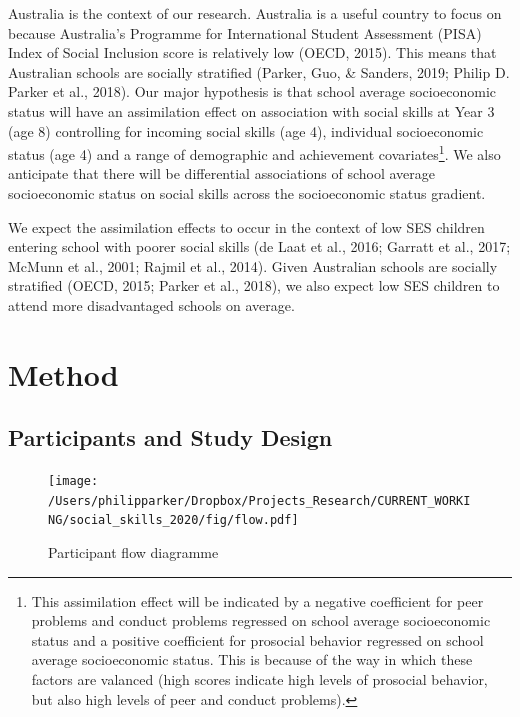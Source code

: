 \documentclass[
  english,
  man]{apa6}
\begin{document}
Australia is the context of our research. Australia is a useful country to focus on because Australia's Programme for International Student Assessment (PISA) Index of Social Inclusion score is relatively low (OECD, 2015). This means that Australian schools are socially stratified (Parker, Guo, \& Sanders, 2019; Philip D. Parker et al., 2018). Our major hypothesis is that school average socioeconomic status will have an assimilation effect on association with social skills at Year 3 (age 8) controlling for incoming social skills (age 4), individual socioeconomic status (age 4) and a range of demographic and achievement covariates\footnote{This assimilation effect will be indicated by a negative coefficient for peer problems and conduct problems regressed on school average socioeconomic status and a positive coefficient for prosocial behavior regressed on school average socioeconomic status. This is because of the way in which these factors are valanced (high scores indicate high levels of prosocial behavior, but also high levels of peer and conduct problems).}. We also anticipate that there will be differential associations of school average socioeconomic status on social skills across the socioeconomic status gradient.

We expect the assimilation effects to occur in the context of low SES children entering school with poorer social skills (de Laat et al., 2016; Garratt et al., 2017; McMunn et al., 2001; Rajmil et al., 2014). Given Australian schools are socially stratified (OECD, 2015; Parker et al., 2018), we also expect low SES children to attend more disadvantaged schools on average.

\hypertarget{method}{%
\section{Method}\label{method}}

\hypertarget{participants-and-study-design}{%
\subsection{Participants and Study Design}\label{participants-and-study-design}}

\begin{figure}
\centering
\texttt{[image: /Users/philipparker/Dropbox/Projects\_Research/CURRENT\_WORKING/social\_skills\_2020/fig/flow.pdf]}
\caption{\label{fig:consort}Participant flow diagramme}
\end{figure}
\end{document}
